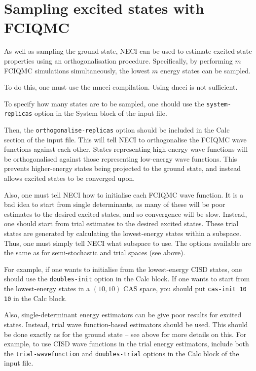 \documentclass[a4paper,notitlepage]{scrreprt}
\let\code\lstinline
\begin{document}
\section{Sampling excited states with FCIQMC}

    As well as sampling the ground state, NECI can be used to estimate
    excited-state properties using an orthogonalisation procedure.
    Specifically, by performing $m$ FCIQMC simulations simultaneously,
    the lowest $m$ energy states can be sampled.

    To do this, one must use the mneci compilation. Using dneci is not
    sufficient.

    To specify how many states are to be sampled, one should use the
    \code{system-replicas} option in the System block of the input file.

    Then, the \code{orthogonalise-replicas} option should be included in
    the Calc section of the input file. This will tell NECI to orthogonalise
    the FCIQMC wave functions against each other. States representing
    high-energy wave functions will be orthogonalised against those
    representing low-energy wave functions. This prevents higher-energy
    states being projected to the ground state, and instead allows
    excited states to be converged upon.

    Also, one must tell NECI how to initialise each FCIQMC wave function.
    It is a bad idea to start from single determinants, as many of these
    will be poor estimates to the desired excited states, and so
    convergence will be slow. Instead, one should start from trial estimates
    to the desired excited states. These trial states are generated by
    calculating the lowest-energy states within a subspace.
    Thus, one must simply tell NECI what subspace to use. The options
    available are the same as for semi-stochastic and trial spaces (see above).

    For example, if one wants to initialise from the lowest-energy CISD states,
    one should use the \code{doubles-init} option in the Calc block. If one
    wants to start from the lowest-energy states in a $(10,10)$ CAS space, you
    should put \code{cas-init 10 10} in the Calc block.

    Also, single-determinant energy estimators can be give poor results for
    excited states. Instead, trial wave function-based estimators should be
    used. This should be done exactly as for the ground state -- see above for
    more details on this. For example, to use CISD wave functions in the trial
    energy estimators, include both the \code{trial-wavefunction} and
    \code{doubles-trial} options in the Calc block of the input file.
\end{document}
